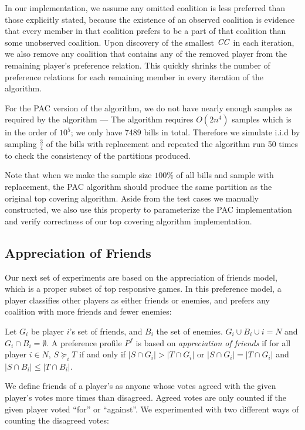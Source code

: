 In our implementation, we assume any omitted coalition is less preferred
than those explicitly stated, because the existence of an observed
coalition is evidence that every member in that coalition prefers to be
a part of that coalition than some unobserved coalition.
Upon discovery of the smallest $\mathit{CC}$ in each iteration, we also remove any coalition that contains any of the removed player from the remaining player's preference relation. This quickly shrinks the number of preference relations for each remaining member in every iteration of the algorithm.

For the PAC version of the algorithm, we do not have nearly enough samples
as required by the algorithm --- The algorithm requires $O(2n^4)$ samples
which is in the order of $10^5$; we only have 7489 bills in total.
Therefore we simulate i.i.d by sampling $\frac{3}{4}$ of the bills
with replacement and repeated the algorithm run 50 times to check
the consistency of the partitions produced.

Note that when we make the sample size $100\%$ of all bills and sample
with replacement, the PAC algorithm should produce the same partition
as the original top covering algorithm.
Aside from the test cases we manually constructed, we also use this property to parameterize the PAC implementation and verify correctness of
our top covering algorithm implementation.


\subsection{Appreciation of Friends}
\label{subsec:appreciation_of_friends}

Our next set of experiments are based on the appreciation of friends model,
which is a proper subset of top responsive games.
In this preference model, a player classifies other players as either friends
or enemies, and prefers any coalition with more friends and fewer enemies:

Let $G_i$ be player $i$'s set of friends, and $B_i$ the set of enemies. $G_i \cup B_i \cup i = N$ and $G_i \cap B_i = \emptyset$. A preference profile $P^f$ is based on \textit{appreciation of friends} if for all player $i \in N$, $S \succeq_i T$ if and only if $|S \cap G_i| > |T \cap G_i|$ or $|S \cap G_i| = |T \cap G_i|$ and $|S \cap B_i| \leq |T \cap B_i|$.

We define friends of a player's as anyone whose votes agreed with the given
player's votes more times than disagreed.
Agreed votes are only counted if the given player voted ``for'' or ``against''.
We experimented with two different ways of counting the disagreed votes:

